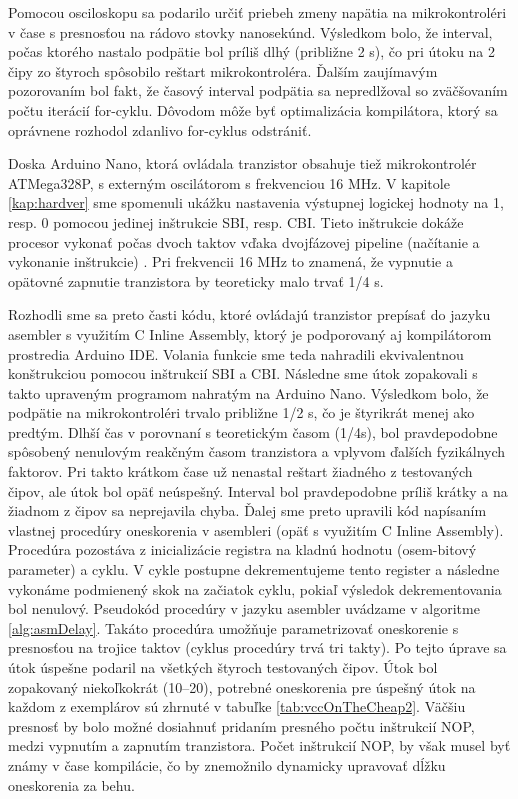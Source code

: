 Pomocou osciloskopu sa podarilo určiť priebeh zmeny napätia na mikrokontroléri v čase s presnosťou na rádovo stovky nanosekúnd. Výsledkom bolo, že interval, počas ktorého nastalo podpätie bol príliš dlhý (približne 2 {\textmu}s), čo pri útoku na 2 čipy zo štyroch spôsobilo reštart mikrokontroléra. Ďalším zaujímavým pozorovaním bol fakt, že časový interval podpätia sa nepredlžoval so zväčšovaním počtu iterácií  for-cyklu. Dôvodom môže byť optimalizácia kompilátora, ktorý sa oprávnene rozhodol zdanlivo  for-cyklus odstrániť.

Doska Arduino Nano, ktorá ovládala tranzistor obsahuje tiež mikrokontrolér ATMega328P, s externým oscilátorom s frekvenciou 16 MHz. V kapitole \ref{kap:hardver} sme spomenuli ukážku nastavenia výstupnej logickej hodnoty na 1, resp. 0 pomocou jedinej inštrukcie SBI, resp. CBI. Tieto inštrukcie dokáže procesor vykonať počas dvoch taktov vďaka dvojfázovej pipeline (načítanie a vykonanie inštrukcie) \cite{atmegaData}. Pri frekvencii 16 MHz to znamená, že vypnutie a opätovné zapnutie tranzistora by teoreticky malo trvať 1/4 {\textmu}s. 

Rozhodli sme sa preto časti kódu, ktoré ovládajú tranzistor prepísať do jazyku asembler s využitím C Inline Assembly, ktorý je podporovaný aj kompilátorom prostredia Arduino IDE. Volania funkcie  sme teda nahradili ekvivalentnou konštrukciou pomocou inštrukcií SBI a CBI. Následne sme útok zopakovali s takto upraveným programom nahratým na Arduino Nano. Výsledkom bolo, že podpätie na mikrokontroléri trvalo približne 1/2 {\textmu}s, čo je štyrikrát menej ako predtým. Dlhší čas v porovnaní s teoretickým časom (1/4{\textmu}s), bol pravdepodobne spôsobený nenulovým reakčným časom tranzistora a vplyvom ďalších fyzikálnych faktorov. Pri takto krátkom čase už nenastal reštart žiadného z testovaných čipov, ale útok bol opäť neúspešný. Interval bol pravdepodobne príliš krátky a na žiadnom z čipov sa neprejavila chyba. Ďalej sme preto upravili kód napísaním vlastnej procedúry oneskorenia v asembleri (opäť s využitím C Inline Assembly). Procedúra pozostáva z inicializácie registra na kladnú hodnotu (osem-bitový parameter) a cyklu. V cykle postupne dekrementujeme tento register a následne vykonáme podmienený skok na začiatok cyklu, pokiaľ výsledok dekrementovania bol nenulový. Pseudokód procedúry v jazyku asembler uvádzame v algoritme \ref{alg:asmDelay}. Takáto procedúra umožňuje parametrizovať oneskorenie s presnosťou na trojice taktov (cyklus procedúry trvá tri takty). Po tejto úprave sa útok úspešne podaril na všetkých štyroch testovaných čipov. Útok bol zopakovaný niekoľkokrát (10--20), potrebné oneskorenia pre úspešný útok na každom z exemplárov sú zhrnuté v tabuľke \ref{tab:vccOnTheCheap2}. Väčšiu presnosť by bolo možné dosiahnuť pridaním presného počtu inštrukcií NOP, medzi vypnutím a zapnutím tranzistora. Počet inštrukcií NOP, by však musel byť známy v čase kompilácie, čo by znemožnilo dynamicky upravovať dĺžku oneskorenia za behu.

